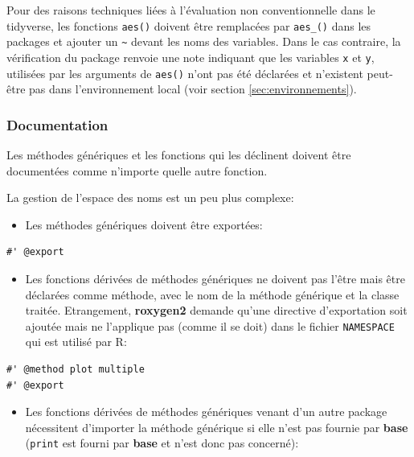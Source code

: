 \documentclass[
  11pt,
  french,
  a4paper,
  extrafontsizes,onecolumn,openright
  ]{memoir}
\providecommand{\tightlist}{%
  \setlength{\itemsep}{0pt}\setlength{\parskip}{0pt}}
\begin{document}
\normalsize

Pour des raisons techniques liées à l'évaluation non conventionnelle dans le tidyverse, les fonctions \texttt{aes()} doivent être remplacées par \texttt{aes\_()} dans les packages et ajouter un \texttt{\textasciitilde{}} devant les noms des variables.
Dans le cas contraire, la vérification du package renvoie une note indiquant que les variables \texttt{x} et \texttt{y}, utilisées par les arguments de \texttt{aes()} n'ont pas été déclarées et n'existent peut-être pas dans l'environnement local (voir section \ref{sec:environnements}).

\hypertarget{documentation}{%
\subsubsection{Documentation}\label{documentation}}

Les méthodes génériques et les fonctions qui les déclinent doivent être documentées comme n'importe quelle autre fonction.

La gestion de l'espace des noms est un peu plus complexe:

\begin{itemize}
\tightlist
\item
  Les méthodes génériques doivent être exportées:
\end{itemize}

\begin{verbatim}
#' @export
\end{verbatim}

\begin{itemize}
\tightlist
\item
  Les fonctions dérivées de méthodes génériques ne doivent pas l'être mais être déclarées comme méthode, avec le nom de la méthode générique et la classe traitée. Etrangement, \textbf{roxygen2} demande qu'une directive d'exportation soit ajoutée mais ne l'applique pas (comme il se doit) dans le fichier \texttt{NAMESPACE} qui est utilisé par R:
\end{itemize}

\begin{verbatim}
#' @method plot multiple
#' @export
\end{verbatim}

\begin{itemize}
\tightlist
\item
  Les fonctions dérivées de méthodes génériques venant d'un autre package nécessitent d'importer la méthode générique si elle n'est pas fournie par \textbf{base} (\texttt{print} est fourni par \textbf{base} et n'est donc pas concerné):
\end{itemize}
\end{document}
